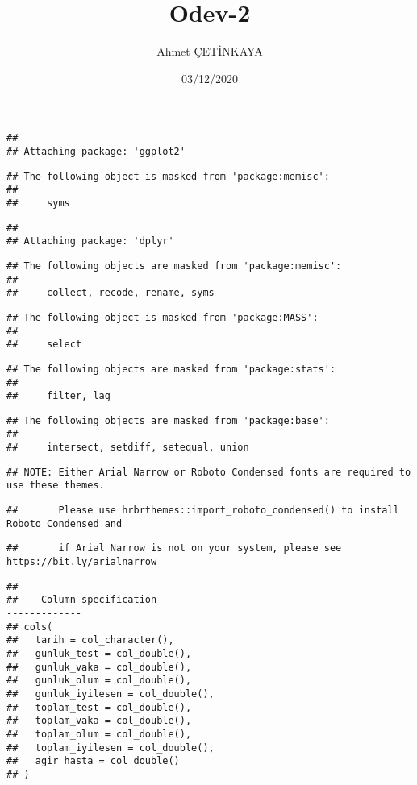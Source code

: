 \documentclass[
]{article}
\title{Odev-2}
\author{Ahmet ÇETİNKAYA}
\date{03/12/2020}
\begin{document}
\maketitle

\begin{verbatim}
## 
## Attaching package: 'ggplot2'
\end{verbatim}

\begin{verbatim}
## The following object is masked from 'package:memisc':
## 
##     syms
\end{verbatim}

\begin{verbatim}
## 
## Attaching package: 'dplyr'
\end{verbatim}

\begin{verbatim}
## The following objects are masked from 'package:memisc':
## 
##     collect, recode, rename, syms
\end{verbatim}

\begin{verbatim}
## The following object is masked from 'package:MASS':
## 
##     select
\end{verbatim}

\begin{verbatim}
## The following objects are masked from 'package:stats':
## 
##     filter, lag
\end{verbatim}

\begin{verbatim}
## The following objects are masked from 'package:base':
## 
##     intersect, setdiff, setequal, union
\end{verbatim}

\begin{verbatim}
## NOTE: Either Arial Narrow or Roboto Condensed fonts are required to use these themes.
\end{verbatim}

\begin{verbatim}
##       Please use hrbrthemes::import_roboto_condensed() to install Roboto Condensed and
\end{verbatim}

\begin{verbatim}
##       if Arial Narrow is not on your system, please see https://bit.ly/arialnarrow
\end{verbatim}

\begin{verbatim}
## 
## -- Column specification --------------------------------------------------------
## cols(
##   tarih = col_character(),
##   gunluk_test = col_double(),
##   gunluk_vaka = col_double(),
##   gunluk_olum = col_double(),
##   gunluk_iyilesen = col_double(),
##   toplam_test = col_double(),
##   toplam_vaka = col_double(),
##   toplam_olum = col_double(),
##   toplam_iyilesen = col_double(),
##   agir_hasta = col_double()
## )
\end{verbatim}
\end{document}
